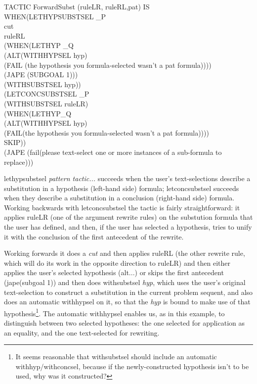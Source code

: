 \documentclass[11pt]{book}
\newcommand{\tab}{\hspace{5mm}}
\begin{document}
TACTIC ForwardSubst (ruleLR, ruleRL,pat) IS\\
\tab WHEN\tab (LETHYPSUBSTSEL \_P \\
\tab \tab \tab cut\\
\tab \tab \tab ruleRL \\
\tab \tab \tab (WHEN\tab (LETHYP \_Q \\
\tab \tab \tab \tab \tab (ALT\tab (WITHHYPSEL hyp) \\
\tab \tab \tab \tab \tab \tab (FAIL (the hypothesis you formula-selected wasn't a pat formula))))\\
\tab \tab \tab \tab (JAPE (SUBGOAL 1))) \\
\tab \tab \tab (WITHSUBSTSEL hyp))\\
\tab \tab (LETCONCSUBSTSEL \_P\\
\tab \tab \tab (WITHSUBSTSEL ruleLR)\\
\tab \tab \tab (WHEN\tab (LETHYP\_Q \\
\tab \tab \tab \tab \tab (ALT\tab (WITHHYPSEL hyp) \\
\tab \tab \tab \tab \tab \tab (FAIL(the hypothesis you formula-selected wasn't a pat formula))))\\
\tab \tab \tab \tab SKIP))\\
\tab \tab (JAPE (fail(please text-select one or more instances of a sub-formula to replace)))


lethypsubstsel \textit{pattern tactic...} succeeds when the user's text-selections describe a substitution in a hypothesis (left-hand side) formula; letconcsubstsel succeeds when they describe a substitution in a conclusion (right-hand side) formula.\\
Working backwards with letconcsubstsel the tactic is fairly straightforward: it applies ruleLR (one of the argument rewrite rules) on the substution formula that the user has defined, and then, if the user has selected a hypothesis, tries to unify it with the conclusion of the first antecedent of the rewrite.


Working forwards it does a \textit{cut} and then applies ruleRL (the other rewrite rule, which will do its work in the opposite direction to ruleLR) and then either applies the user's selected hypothesis (alt...) or skips the first antecedent (jape(subgoal 1)) and then does withsubstsel \textit{hyp}, which uses the user's original text-selection to construct a substitution in the current problem sequent, and also does an automatic withhypsel on it, so that the \textit{hyp} is bound to make use of that hypothesis\footnote{It seems reasonable that withsubstsel should include an automatic withhyp/withconcsel, because if the newly-constructed hypothesis isn't to be used, why was it constructed?}. The automatic withhypsel enables us, as in this example, to distinguish between two selected hypotheses: the one selected for application as an equality, and the one text-selected for rewriting.
\end{document}
